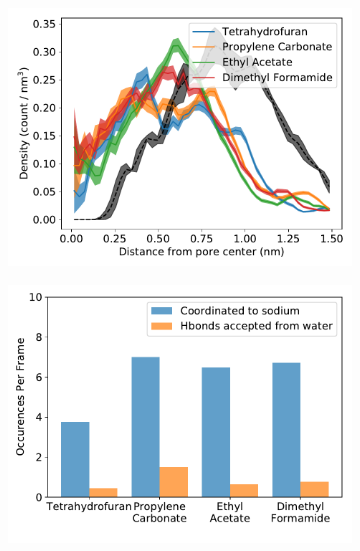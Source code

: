 \documentclass{article}
\begin{document}
  \begin{figure}
  \centering
  \begin{subfigure}{0.45\textwidth}
  \includegraphics[width=\textwidth]{nondonors_rdf.pdf}
  \caption{}\label{fig:nondonors_rdf}
  \end{subfigure}
  \begin{subfigure}{0.45\textwidth}
  \includegraphics[width=\textwidth]{nondonor_hbonds.pdf}
  \caption{}\label{fig:nondonors_hbonds}
  \end{subfigure}
  \end{figure}
  
\end{document}

